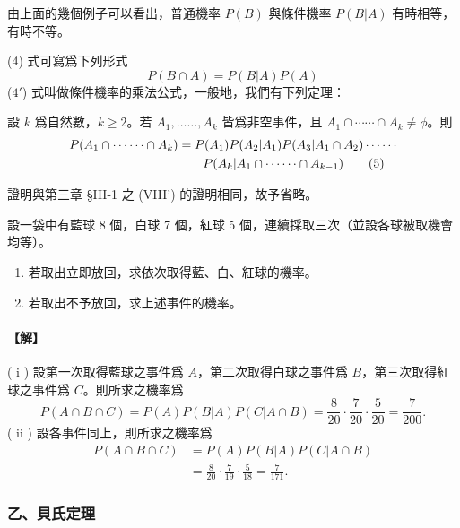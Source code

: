 由上面的幾個例子可以看出，普通機率 $P(B)$ 與條件機率 $P(B|A)$ 有時相等，有時不等。

(4) 式可寫爲下列形式
\begin{equation}\tag{$4'$}\label{eq:b5s-4-4prime}
P(B \cap A) = P(B|A) P(A)
\end{equation}
($4'$) 式叫做條件機率的乘法公式，一般地，我們有下列定理：

\medskip
\begin{theorem}[*]\label{thm:b5s-4-3}
設 $k$ 爲自然數，$k \ge 2$。若 $A_1, \dots\dots, A_k$ 皆爲非空事件，且 $A_1 \cap \cdots\cdots \cap A_k \neq \phi$。則
\begin{align}
P(A_1 \cap \cdots\cdots \cap A_k) &= P(A_1) P(A_2|A_1) P(A_3|A_1 \cap A_2) \cdots\cdots \notag \\
&\quad\quad P(A_k|A_1 \cap \cdots\cdots \cap A_{k-1}) \tag{5}\label{eq:b5s-4-5}
\end{align}
\end{theorem}
證明與第三章 §III-1 之 (VIII') 的證明相同，故予省略。

\medskip
\begin{example}[*]\label{ex:b5s-4-8}
設一袋中有藍球 8 個，白球 7 個，紅球 5 個，連續採取三次（並設各球被取機會均等）。
\begin{enumerate}[label=(\roman*), itemsep=2pt, topsep=2pt]
  \item 若取出立即放回，求依次取得藍、白、紅球的機率。
  \item 若取出不予放回，求上述事件的機率。
\end{enumerate}
\end{example}
\paragraph{【解】}
( i ) 設第一次取得藍球之事件爲 $A$，第二次取得白球之事件爲 $B$，第三次取得紅球之事件爲 $C$。則所求之機率爲
\[
P(A \cap B \cap C) = P(A) P(B|A) P(C|A \cap B) = \frac{8}{20} \cdot \frac{7}{20} \cdot \frac{5}{20} = \frac{7}{200}.
\]
( ii ) 設各事件同上，則所求之機率爲
\begin{align*}
P(A \cap B \cap C) &= P(A) P(B|A) P(C|A \cap B) \\
&= \frac{8}{20} \cdot \frac{7}{19} \cdot \frac{5}{18} = \frac{7}{171}. \tag*{\#}
\end{align*}

\subsubsection*{乙、貝氏定理}


